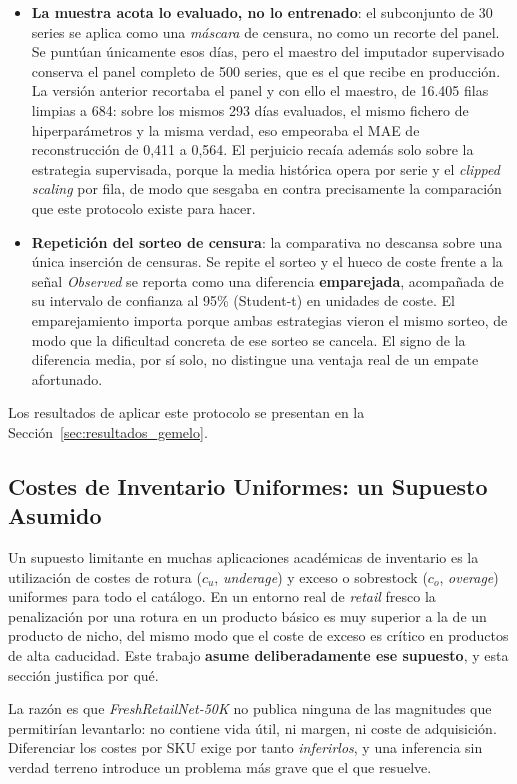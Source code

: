 \begin{itemize}
    \item \textbf{La muestra acota lo evaluado, no lo entrenado}: el subconjunto de 30 series se aplica como una \emph{máscara} de censura, no como un recorte del panel. Se puntúan únicamente esos días, pero el maestro del imputador supervisado conserva el panel completo de 500 series, que es el que recibe en producción. La versión anterior recortaba el panel y con ello el maestro, de 16.405 filas limpias a 684: sobre los mismos 293 días evaluados, el mismo fichero de hiperparámetros y la misma verdad, eso empeoraba el MAE de reconstrucción de 0{,}411 a 0{,}564. El perjuicio recaía además solo sobre la estrategia supervisada, porque la media histórica opera por serie y el \textit{clipped scaling} por fila, de modo que sesgaba en contra precisamente la comparación que este protocolo existe para hacer.
    \item \textbf{Repetición del sorteo de censura}: la comparativa no descansa sobre una única inserción de censuras. Se repite el sorteo y el hueco de coste frente a la señal \textit{Observed} se reporta como una diferencia \textbf{emparejada}, acompañada de su intervalo de confianza al 95\% (Student-t) en unidades de coste. El emparejamiento importa porque ambas estrategias vieron el mismo sorteo, de modo que la dificultad concreta de ese sorteo se cancela. El signo de la diferencia media, por sí solo, no distingue una ventaja real de un empate afortunado.
\end{itemize}

Los resultados de aplicar este protocolo se presentan en la Sección~\ref{sec:resultados_gemelo}.


\subsection{Costes de Inventario Uniformes: un Supuesto Asumido}
\label{sec:cost_profiles}

Un supuesto limitante en muchas aplicaciones académicas de inventario es la utilización de costes de rotura ($c_u$, \textit{underage}) y exceso o sobrestock ($c_o$, \textit{overage}) uniformes para todo el catálogo. En un entorno real de \textit{retail} fresco la penalización por una rotura en un producto básico es muy superior a la de un producto de nicho, del mismo modo que el coste de exceso es crítico en productos de alta caducidad. Este trabajo \textbf{asume deliberadamente ese supuesto}, y esta sección justifica por qué.

La razón es que \textit{FreshRetailNet-50K} no publica ninguna de las magnitudes que permitirían levantarlo: no contiene vida útil, ni margen, ni coste de adquisición. Diferenciar los costes por SKU exige por tanto \emph{inferirlos}, y una inferencia sin verdad terreno introduce un problema más grave que el que resuelve.

